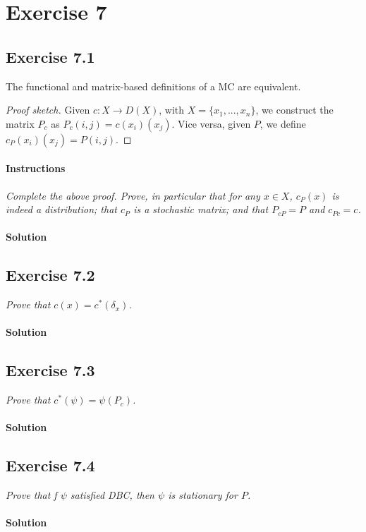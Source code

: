 \section*{Exercise 7}

\subsection*{Exercise 7.1}
\begin{proposition}
    The functional and matrix-based definitions of a MC are equivalent.
\end{proposition}

\begin{proof}[Proof sketch]
    Given $ c : X \to  D(X) $, with $ X = \{x_{1}, . . . , x_{n}\} $, we construct the 
    matrix $ P_{c} $ as $ P_{c}(i, j) = c(x_{i})(x_{j}) $. 
    Vice versa, given $ P $, we define $ c_{P}(x_{i})(x_{j}) = P(i, j) $.
\end{proof}

\paragraph{Instructions} \textit{Complete the above proof. Prove, in particular that for any $ x \in X $, $ c_{P} (x) $ is indeed a distribution; 
that $ c_{P} $ is a stochastic matrix; and that $ P_{cP} = P $ and $ c_{Pc} = c $.}

\paragraph{Solution}


\subsection*{Exercise 7.2}
\textit{Prove that $ c(x) = c^{*}(\delta_{x}) $.}

\paragraph{Solution}


\subsection*{Exercise 7.3}
\textit{Prove that $ c^{*}(\psi) = \psi(P_{c}) $.}

\paragraph{Solution}


\subsection*{Exercise 7.4}
\textit{Prove that f $ \psi $ satisfied DBC, then $ \psi $ is stationary for $ P $.}

\paragraph{Solution}